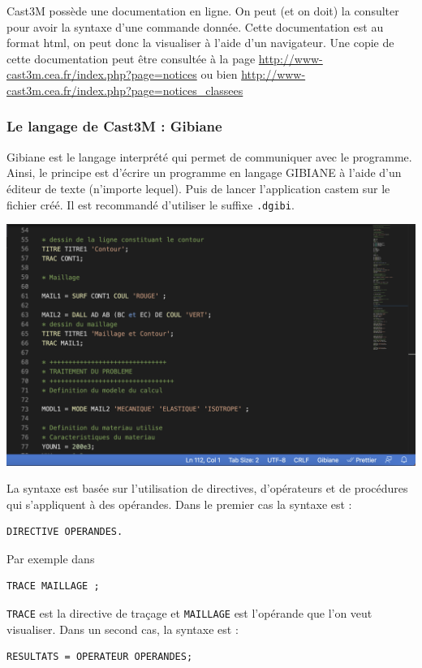\documentclass[a4paper,multicol]{article}
\begin{document}
Cast3M possède une documentation en ligne. On peut (et on doit) la consulter pour avoir
la syntaxe d'une commande donnée. Cette documentation est au format html, on peut donc
la visualiser à l'aide d'un navigateur.
Une copie de cette documentation peut être consultée à la page
\href{http://www-cast3m.cea.fr/index.php?page=notices}{http://www-cast3m.cea.fr/index.php?page=notices} ou bien 
\href{http://www-cast3m.cea.fr/index.php?page=notices\_classees} {http://www-cast3m.cea.fr/index.php?page=notices\_classees}


\subsubsection*{Le langage de Cast3M : Gibiane}
Gibiane est le langage interprété qui permet de communiquer avec le programme. Ainsi,
le principe est d'écrire un programme en langage GIBIANE à l'aide d'un éditeur de texte
(n'importe lequel). Puis de lancer l'application castem sur le fichier créé. Il est recommandé
d'utiliser le suffixe {\tt .dgibi}.
\begin{center}
\includegraphics[scale=0.25]{example-1-1.png} 
\end{center}
La syntaxe est basée sur l'utilisation de directives, d'opérateurs et de procédures qui
s'appliquent à des opérandes. Dans le premier cas la syntaxe est :
\begin{verbatim}
DIRECTIVE OPERANDES.
\end{verbatim}
Par exemple dans
\begin{verbatim}
TRACE MAILLAGE ;
\end{verbatim}
{\tt TRACE} est la directive de traçage et {\tt MAILLAGE} est l'opérande que l'on veut visualiser. Dans
un second cas, la syntaxe est :
\begin{verbatim}
RESULTATS = OPERATEUR OPERANDES;
\end{verbatim}
\end{document}
